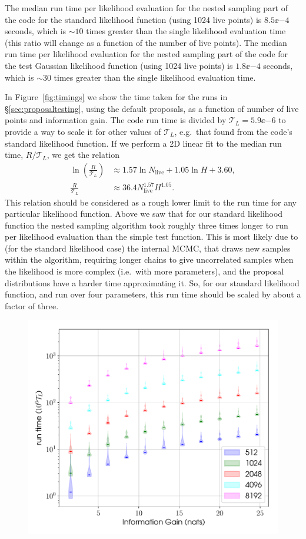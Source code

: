 The median run time per likelihood evaluation for the nested sampling part of the code for the standard likelihood function (using 1024 live points) 
is $8.5\ee{-4}$ seconds, which is $\sim 10$ times greater than the single likelihood evaluation time (this ratio will change as a function of the number
of live points). The median run time per likelihood evaluation for the nested sampling part of the code for the test Gaussian likelihood function
(using 1024 live points) is $1.8\ee{-4}$ seconds, which is $\sim 30$ times greater than the single likelihood evaluation time.

In Figure~\ref{fig:timings} we show the time taken for the runs in \S\ref{sec:proposaltesting},
using the default proposals, as a function of number of live points and information gain. The code run time is divided by $\mathcal{T}_{L}= 5.9\ee{-6}$ to
provide a way to scale it for other values of $\mathcal{T}_{L}$, e.g.\ that found from the code's standard likelihood function. If we perform a 2D linear
fit to the median run time, $R/\mathcal{T}_L$, we get the relation
\begin{align}\label{eq:runtime}
 \ln{\left(\frac{R}{\mathcal{T}_L}\right)} &\approx 1.57 \ln{N_{\text{live}}} + 1.05 \ln{H} + 3.60, \\
 \frac{R}{\mathcal{T}_L} &\approx 36.4 N_{\text{live}}^{1.57} H^{1.05}.
\end{align}
This relation should be considered as a rough lower limit to the run time for any particular likelihood function. Above we saw that for our standard likelihood
function the nested sampling algorithm took roughly three times longer to run per likelihood evaluation than the simple test function. This is most likely due
to (for the standard likelihood case) the internal MCMC, that draws new samples within the algorithm, requiring longer chains to give uncorrelated samples when
the likelihood is more complex (i.e.\ with more parameters), and the proposal distributions have a harder time approximating it. So, for our standard likelihood
function, and run over four parameters, this run time should be scaled by about a factor of three.

\begin{figure}[!phtb]
\begin{center}
\includegraphics[width=1\columnwidth]{./figures/proptesting/walk_uniform_prop/timing/walk_uniform_prop_timings}
\caption{ \protect}
\end{center}
\end{figure}
